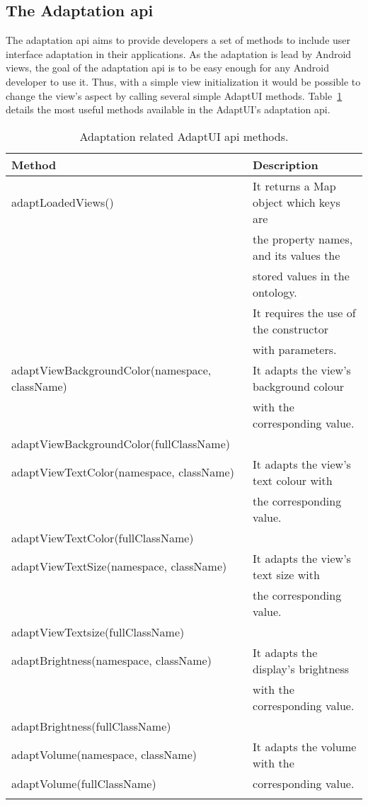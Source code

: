 \subsection{The Adaptation \ac{api}}
\label{sec:adaptation_api}

The adaptation \ac{api} aims to provide developers a set of methods to include
user interface adaptation in their applications. As the adaptation is lead by
Android views, the goal of the adaptation \ac{api} is to be easy enough for
any Android developer to use it. Thus, with a simple view initialization
it would be possible to change the view's aspect by calling several simple 
AdaptUI methods. Table~\ref{tbl:api_adaptation} details the most useful methods 
available in the AdaptUI's adaptation \ac{api}.

\begin{center}
\footnotesize
\begin{longtable}{l l}
  
  \label{tbl:api_adaptation} \\
  \hline 
  \textbf{Method}				& \textbf{Description}			\\
  \hline
  adaptLoadedViews()				& It returns a Map object which keys are\\
						& the property names, and its values the\\
						& stored values in the ontology.	\\
						& It requires the use of the constructor\\
						& with parameters.			\\
  adaptViewBackgroundColor(namespace, className)& It adapts the view's background colour\\
						& with the corresponding value.		\\
  adaptViewBackgroundColor(fullClassName)	& 					\\
  adaptViewTextColor(namespace, className)	& It adapts the view's text colour with \\
						& the corresponding value.		\\
  adaptViewTextColor(fullClassName)		&					\\
  adaptViewTextSize(namespace, className)	& It adapts the view's text size with 	\\
						& the corresponding value.		\\
  adaptViewTextsize(fullClassName)		&					\\
  adaptBrightness(namespace, className)		& It adapts the display's brightness 	\\
						& with the corresponding value.		\\
  adaptBrightness(fullClassName)		& 					\\
  adaptVolume(namespace, className)		& It adapts the volume with the 	\\
  adaptVolume(fullClassName)			& corresponding value.			\\
  \hline
  \caption{Adaptation related AdaptUI \ac{api} methods.}\\
\end{longtable}
\end{center}

